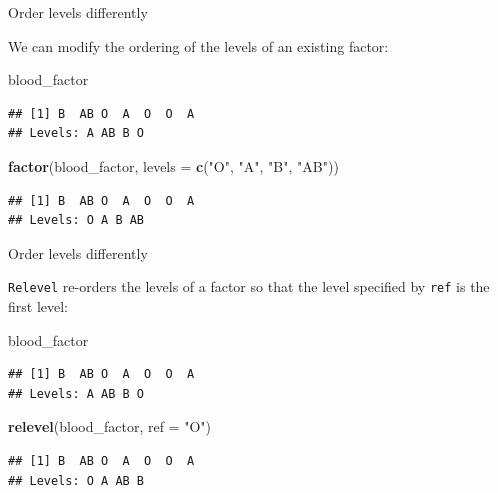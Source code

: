 \documentclass[ignorenonframetext,]{beamer}
\newenvironment{Shaded}{\begin{snugshade}}{\end{snugshade}}
\newcommand{\DataTypeTok}[1]{\textcolor[rgb]{0.13,0.29,0.53}{#1}}
\newcommand{\KeywordTok}[1]{\textcolor[rgb]{0.13,0.29,0.53}{\textbf{#1}}}
\newcommand{\NormalTok}[1]{#1}
\newcommand{\StringTok}[1]{\textcolor[rgb]{0.31,0.60,0.02}{#1}}
\begin{document}
\begin{frame}[fragile]{Order levels differently}
\protect\hypertarget{order-levels-differently}{}

We can modify the ordering of the levels of an existing factor:

\begin{Shaded}
\begin{Highlighting}[]
\NormalTok{blood_factor}
\end{Highlighting}
\end{Shaded}

\begin{verbatim}
## [1] B  AB O  A  O  O  A 
## Levels: A AB B O
\end{verbatim}

\begin{Shaded}
\begin{Highlighting}[]
\KeywordTok{factor}\NormalTok{(blood_factor, }\DataTypeTok{levels =} \KeywordTok{c}\NormalTok{(}\StringTok{"O"}\NormalTok{, }\StringTok{"A"}\NormalTok{, }\StringTok{"B"}\NormalTok{, }\StringTok{"AB"}\NormalTok{))}
\end{Highlighting}
\end{Shaded}

\begin{verbatim}
## [1] B  AB O  A  O  O  A 
## Levels: O A B AB
\end{verbatim}

\end{frame}

\begin{frame}[fragile]{Order levels differently}
\protect\hypertarget{order-levels-differently-1}{}

\texttt{Relevel} re-orders the levels of a factor so that the level
specified by \texttt{ref} is the first level:

\begin{Shaded}
\begin{Highlighting}[]
\NormalTok{blood_factor}
\end{Highlighting}
\end{Shaded}

\begin{verbatim}
## [1] B  AB O  A  O  O  A 
## Levels: A AB B O
\end{verbatim}

\begin{Shaded}
\begin{Highlighting}[]
\KeywordTok{relevel}\NormalTok{(blood_factor, }\DataTypeTok{ref =} \StringTok{"O"}\NormalTok{)}
\end{Highlighting}
\end{Shaded}

\begin{verbatim}
## [1] B  AB O  A  O  O  A 
## Levels: O A AB B
\end{verbatim}

\end{frame}
\end{document}
